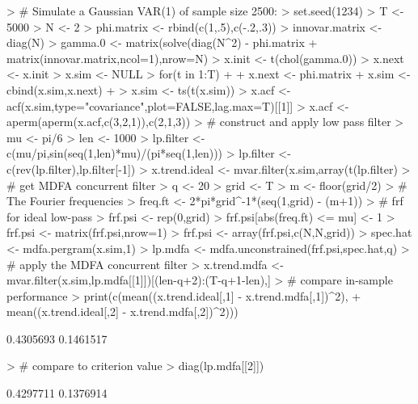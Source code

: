 \documentclass[a4paper]{book}
\begin{document}
\begin{Schunk}
\begin{Sinput}
> # Simulate a Gaussian VAR(1) of sample size 2500:
> set.seed(1234)
> T <- 5000
> N <- 2
> phi.matrix <- rbind(c(1,.5),c(-.2,.3))
> innovar.matrix <- diag(N)
> gamma.0 <- matrix(solve(diag(N^2) - phi.matrix %
+ 	matrix(innovar.matrix,ncol=1),nrow=N)
> x.init <- t(chol(gamma.0)) %
> x.next <- x.init
> x.sim <- NULL
> for(t in 1:T)
+ {
+ 	x.next <- phi.matrix %
+ 	x.sim <- cbind(x.sim,x.next)
+ }
> x.sim <- ts(t(x.sim))
> x.acf <- acf(x.sim,type="covariance",plot=FALSE,lag.max=T)[[1]]
> x.acf <- aperm(aperm(x.acf,c(3,2,1)),c(2,1,3))
> # construct and apply low pass filter
> mu <- pi/6
> len <- 1000
> lp.filter <- c(mu/pi,sin(seq(1,len)*mu)/(pi*seq(1,len)))
> lp.filter <- c(rev(lp.filter),lp.filter[-1])
> x.trend.ideal <- mvar.filter(x.sim,array(t(lp.filter) %
> # get MDFA concurrent filter
> q <- 20
> grid <- T
> m <- floor(grid/2)
> # The Fourier frequencies
> freq.ft <- 2*pi*grid^{-1}*(seq(1,grid) - (m+1))
> # frf for ideal low-pass
> frf.psi <- rep(0,grid)
> frf.psi[abs(freq.ft) <= mu] <- 1
> frf.psi <- matrix(frf.psi,nrow=1) %
> frf.psi <- array(frf.psi,c(N,N,grid))
> spec.hat <- mdfa.pergram(x.sim,1)	
> lp.mdfa <- mdfa.unconstrained(frf.psi,spec.hat,q)
> # apply the MDFA concurrent filter
> x.trend.mdfa <- mvar.filter(x.sim,lp.mdfa[[1]])[(len-q+2):(T-q+1-len),]
> # compare in-sample performance
> print(c(mean((x.trend.ideal[,1] - x.trend.mdfa[,1])^2),
+ 	mean((x.trend.ideal[,2] - x.trend.mdfa[,2])^2)))
\end{Sinput}
\begin{Soutput}
[1] 0.4305693 0.1461517
\end{Soutput}
\begin{Sinput}
> # compare to criterion value
> diag(lp.mdfa[[2]])
\end{Sinput}
\begin{Soutput}
[1] 0.4297711 0.1376914
\end{Soutput}
\end{Schunk}
\end{document}
